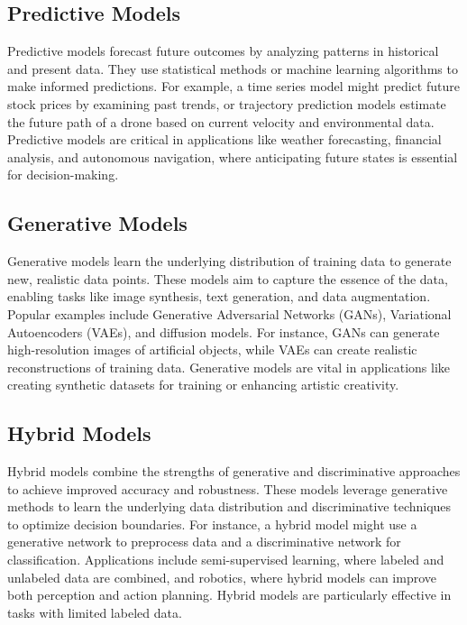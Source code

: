 \subsection{Predictive Models}
Predictive models forecast future outcomes by analyzing patterns in historical and present data. They use statistical methods or machine learning algorithms to make informed predictions. For example, a time series model might predict future stock prices by examining past trends, or trajectory prediction models estimate the future path of a drone based on current velocity and environmental data. Predictive models are critical in applications like weather forecasting, financial analysis, and autonomous navigation, where anticipating future states is essential for decision-making. \cite{bishop-2006-pattern-recognition}

\subsection{Generative Models}
Generative models learn the underlying distribution of training data to generate new, realistic data points. These models aim to capture the essence of the data, enabling tasks like image synthesis, text generation, and data augmentation. Popular examples include Generative Adversarial Networks (GANs), Variational Autoencoders (VAEs), and diffusion models. For instance, GANs can generate high-resolution images of artificial objects, while VAEs can create realistic reconstructions of training data. Generative models are vital in applications like creating synthetic datasets for training or enhancing artistic creativity. \cite{goodfellow-2014-gan}



\subsection{Hybrid Models}
Hybrid models combine the strengths of generative and discriminative approaches to achieve improved accuracy and robustness. These models leverage generative methods to learn the underlying data distribution and discriminative techniques to optimize decision boundaries. For instance, a hybrid model might use a generative network to preprocess data and a discriminative network for classification. Applications include semi-supervised learning, where labeled and unlabeled data are combined, and robotics, where hybrid models can improve both perception and action planning. Hybrid models are particularly effective in tasks with limited labeled data. \cite{raina-2004-hybrid-models}

